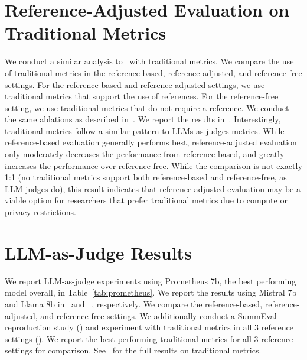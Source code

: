 


\section{Reference-Adjusted Evaluation on Traditional Metrics}\label{sec:6-chapter-trad-ref-eval}
We conduct a similar analysis to~ with traditional metrics. We compare the use of traditional metrics in the reference-based, reference-adjusted, and reference-free settings. For the reference-based and reference-adjusted settings, we use traditional metrics that support the use of references. For the reference-free setting, we use traditional metrics that do not require a reference. We conduct the same ablations as described in~. We report the results in~. Interestingly, traditional metrics follow a similar pattern to LLMs-as-judges metrics. While reference-based evaluation generally performs best, reference-adjusted evaluation only moderately decreases the performance from reference-based, and greatly increases the performance over reference-free. While the comparison is not exactly 1:1 (no traditional metrics support both reference-based and reference-free, as LLM judges do), this result indicates that reference-adjusted evaluation may be a viable option for researchers that prefer traditional metrics due to compute or privacy restrictions.  




\section{LLM-as-Judge Results}
\label{sec:6-chapter-results}

We report LLM-as-judge experiments using Prometheus 7b, the best performing model overall, in Table~\ref{tab:prometheus}. We report the results using Mistral 7b and Llama 8b in~ and ~, respectively. We compare the reference-based, reference-adjusted, and reference-free settings. We additionally conduct a SummEval reproduction study () and experiment with traditional metrics in all 3 reference settings (). We report the best performing traditional metrics for all 3 reference settings for comparison. See~ for the full results on traditional metrics.


